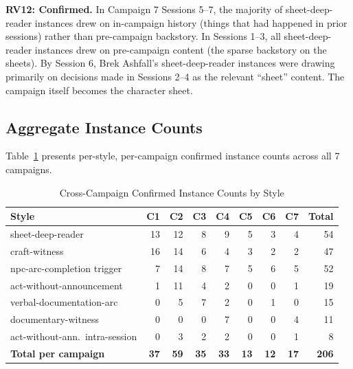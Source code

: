 \textbf{RV12: Confirmed.} In Campaign 7 Sessions 5--7, the majority of
sheet-deep-reader instances drew on in-campaign history (things that had happened in
prior sessions) rather than pre-campaign backstory. In Sessions 1--3, all
sheet-deep-reader instances drew on pre-campaign content (the sparse backstory on the
sheets). By Session 6, Brek Ashfall's sheet-deep-reader instances were drawing
primarily on decisions made in Sessions 2--4 as the relevant ``sheet'' content.
The campaign itself becomes the character sheet.

\subsection{Aggregate Instance Counts}

Table~\ref{tab:cross-campaign-counts} presents per-style, per-campaign confirmed
instance counts across all 7 campaigns.

\begin{table}[t]
\centering
\caption{Cross-Campaign Confirmed Instance Counts by Style}
\label{tab:cross-campaign-counts}
\begin{tabular}{@{}lrrrrrrrr@{}}
\toprule
Style & C1 & C2 & C3 & C4 & C5 & C6 & C7 & Total \\
\midrule
sheet-deep-reader           & 13 & 12 &  8 &  9 &  5 &  3 &  4 &  54 \\
craft-witness               & 16 & 14 &  6 &  4 &  3 &  2 &  2 &  47 \\
npc-arc-completion trigger  &  7 & 14 &  8 &  7 &  5 &  6 &  5 &  52 \\
act-without-announcement    &  1 & 11 &  4 &  2 &  0 &  0 &  1 &  19 \\
verbal-documentation-arc    &  0 &  5 &  7 &  2 &  0 &  1 &  0 &  15 \\
documentary-witness         &  0 &  0 &  0 &  7 &  0 &  0 &  4 &  11 \\
act-without-ann.\ intra-session &  0 &  3 &  2 &  2 &  0 &  0 &  1 &   8 \\
\midrule
\textbf{Total per campaign} & \textbf{37} & \textbf{59} & \textbf{35} & \textbf{33} & \textbf{13} & \textbf{12} & \textbf{17} & \textbf{206} \\
\bottomrule
\end{tabular}
\end{table}

